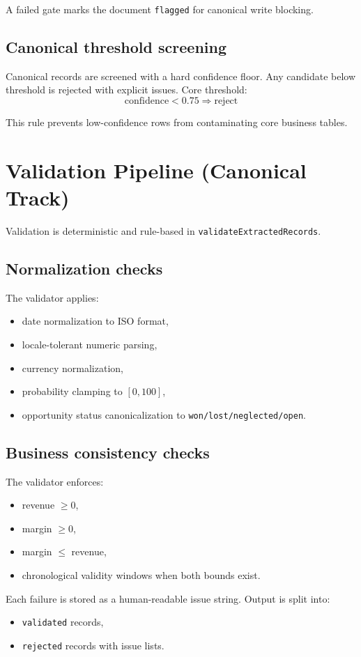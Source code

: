 \documentclass[11pt,a4paper]{article}
\begin{document}
A failed gate marks the document \texttt{flagged} for canonical write blocking.

\subsection{Canonical threshold screening}
Canonical records are screened with a hard confidence floor. Any candidate below threshold is rejected with explicit issues. Core threshold:
\[
\text{confidence} < 0.75 \Rightarrow \text{reject}
\]

This rule prevents low-confidence rows from contaminating core business tables.

\section{Validation Pipeline (Canonical Track)}
Validation is deterministic and rule-based in \texttt{validateExtractedRecords}.

\subsection{Normalization checks}
The validator applies:
\begin{itemize}[leftmargin=*]
  \item date normalization to ISO format,
  \item locale-tolerant numeric parsing,
  \item currency normalization,
  \item probability clamping to $[0,100]$,
  \item opportunity status canonicalization to \texttt{won/lost/neglected/open}.
\end{itemize}

\subsection{Business consistency checks}
The validator enforces:
\begin{itemize}[leftmargin=*]
  \item revenue $\ge 0$,
  \item margin $\ge 0$,
  \item margin $\le$ revenue,
  \item chronological validity windows when both bounds exist.
\end{itemize}

Each failure is stored as a human-readable issue string. Output is split into:
\begin{itemize}[leftmargin=*]
  \item \texttt{validated} records,
  \item \texttt{rejected} records with issue lists.
\end{itemize}
\end{document}
